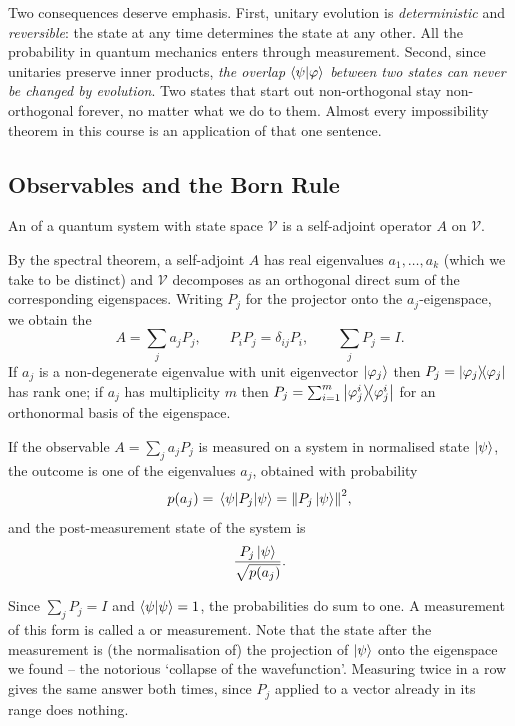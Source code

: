\documentclass[a4paper]{scrartcl}
\newcommand{\Vs}{\mathcal{V}}
\begin{document}
Two consequences deserve emphasis. First, unitary evolution is \emph{deterministic} and \emph{reversible}: the state at any time determines the state at any other. All the probability in quantum mechanics enters through measurement. Second, since unitaries preserve inner products, \emph{the overlap $\ip{\psi}{\varphi}$ between two states can never be changed by evolution}. Two states that start out non-orthogonal stay non-orthogonal forever, no matter what we do to them. Almost every impossibility theorem in this course is an application of that one sentence.

\subsection{Observables and the Born Rule}

\begin{definition}[Observable]
	An  of a quantum system with state space $\Vs$ is a self-adjoint operator $A$ on $\Vs$.
\end{definition}

By the spectral theorem, a self-adjoint $A$ has real eigenvalues $a_1, \dots, a_k$ (which we take to be distinct) and $\Vs$ decomposes as an orthogonal direct sum of the corresponding eigenspaces. Writing $P_j$ for the projector onto the $a_j$-eigenspace, we obtain the 
$$A = \sum_j a_j P_j, \qquad P_iP_j = \delta_{ij}P_i, \qquad \sum_j P_j = I.$$
If $a_j$ is a non-degenerate eigenvalue with unit eigenvector $\ket{\varphi_j}$ then $P_j = \op{\varphi_j}{\varphi_j}$ has rank one; if $a_j$ has multiplicity $m$ then $P_j = \sum_{i=1}^m \op{\varphi_j^i}{\varphi_j^i}$ for an orthonormal basis of the eigenspace.

\begin{axiom}
	If the observable $A = \sum_j a_j P_j$ is measured on a system in normalised state $\ket{\psi}$, the outcome is one of the eigenvalues $a_j$, obtained with probability
	$$p(a_j) = \mel{\psi}{P_j}{\psi} = \norm{P_j \ket{\psi}}^2,$$
	and the post-measurement state of the system is
	$$\frac{P_j\ket{\psi}}{\sqrt{p(a_j)}}.$$
\end{axiom}

Since $\sum_j P_j = I$ and $\ip{\psi}{\psi} = 1$, the probabilities do sum to one. A measurement of this form is called a  or  measurement. Note that the state after the measurement is (the normalisation of) the projection of $\ket{\psi}$ onto the eigenspace we found -- the notorious `collapse of the wavefunction'. Measuring twice in a row gives the same answer both times, since $P_j$ applied to a vector already in its range does nothing.
\end{document}
